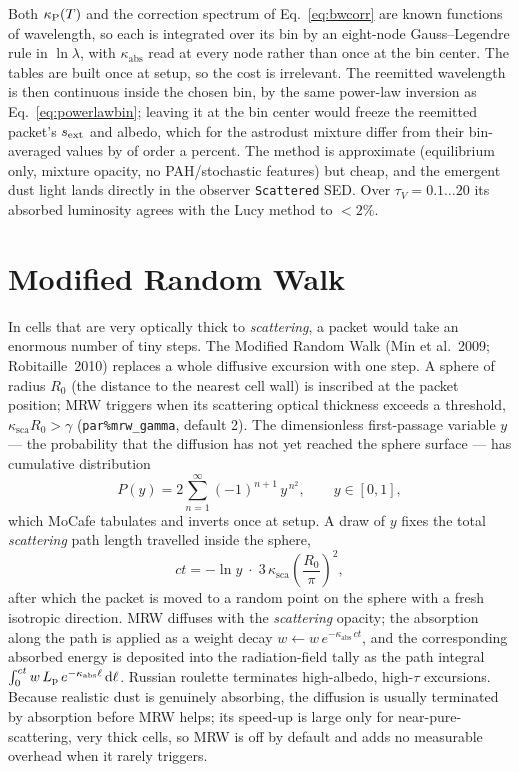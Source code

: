 \documentclass[english,a4paper]{kiseon_memo}
\newcommand{\kabs}{\kappa_{\mathrm{abs}}}
\newcommand{\ksca}{\kappa_{\mathrm{sca}}}
\newcommand{\dd}{\mathrm{d}}
\newcommand{\code}[1]{\texttt{#1}}
\newcommand{\pp}[1]{\texttt{par\%#1}}
\begin{document}
Both $\kappa_{\rm P}(T)$ and the correction spectrum of Eq.~\eqref{eq:bwcorr}
are known functions of wavelength, so each is integrated over its bin by an
eight-node Gauss--Legendre rule in $\ln\lambda$, with $\kabs$ read at every node
rather than once at the bin center.  The tables are built once at setup, so the
cost is irrelevant.  The reemitted wavelength is then continuous inside the
chosen bin, by the same power-law inversion as
Eq.~\eqref{eq:powerlawbin}; leaving it at the bin center would freeze the
reemitted packet's $s_{\rm ext}$ and albedo, which for the astrodust mixture
differ from their bin-averaged values by of order a percent.  The method is approximate (equilibrium only, mixture
opacity, no PAH/stochastic features) but cheap, and the emergent dust light
lands directly in the observer \code{Scattered} SED.  Over $\tau_V=0.1\ldots20$
its absorbed luminosity agrees with the Lucy method to $<2\%$.

\section{Modified Random Walk}\label{sec:mrw}

In cells that are very optically thick to \emph{scattering}, a packet would take
an enormous number of tiny steps.  The Modified Random Walk (Min et al.~2009;
Robitaille~2010) replaces a whole diffusive excursion with one step.  A sphere of
radius $R_0$ (the distance to the nearest cell wall) is inscribed at the packet
position; MRW triggers when its scattering optical thickness exceeds a threshold,
$\ksca R_0 > \gamma$ (\pp{mrw\_gamma}, default 2).  The dimensionless first-passage
variable $y$ --- the probability that the diffusion has not yet reached the sphere
surface --- has cumulative distribution
\begin{equation}
  P(y) = 2\sum_{n=1}^{\infty}(-1)^{n+1}\,y^{\,n^2},\qquad y\in[0,1],
\end{equation}
which MoCafe tabulates and inverts once at setup.  A draw of $y$ fixes the total
\emph{scattering} path length travelled inside the sphere,
\begin{equation}
  ct = -\ln y \;\cdot\; 3\,\ksca \left(\frac{R_0}{\pi}\right)^{\!2},
\end{equation}
after which the packet is moved to a random point on the sphere with a fresh
isotropic direction.  MRW diffuses with the \emph{scattering} opacity; the
absorption along the path is applied as a weight decay
$w\leftarrow w\,e^{-\kabs\,ct}$, and the corresponding absorbed energy is
deposited into the radiation-field tally as the path integral
$\int_0^{ct} w\,L_{\rm p}\,e^{-\kabs\ell}\,\dd\ell$.  Russian roulette
terminates high-albedo, high-$\tau$ excursions.  Because realistic dust is
genuinely absorbing, the diffusion is usually terminated by absorption before
MRW helps; its speed-up is large only for near-pure-scattering, very thick cells,
so MRW is off by default and adds no measurable overhead when it rarely triggers.
\end{document}

